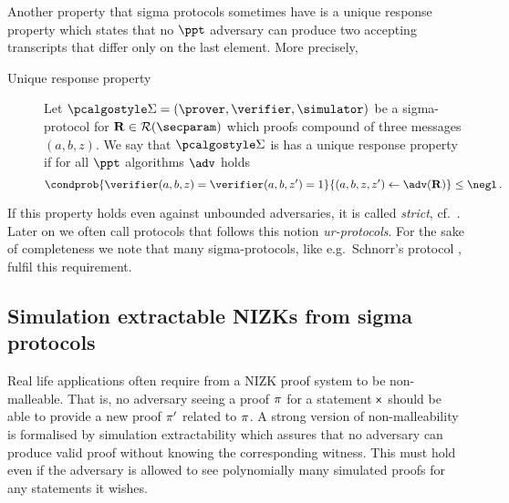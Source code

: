 \let\accentvec\vec \documentclass[runningheads]{llncs}
\begin{document}
Another property that sigma protocols sometimes have is a unique response property \cite{C:Fischlin05} which states that no
$\ppt$ adversary  can produce two accepting transcripts that differ only on
the last element.  More precisely,
\begin{description}
	\item[Unique response property] Let $\sigmaprot = (\prover, \verifier,
			\simulator)$ be a sigma-protocol for $\REL \in \RELGEN(\secparam)$ which
			proofs compound of three messages $(a, b, z)$. We say that
			$\sigmaprot$ is has a unique response property if for all $\ppt$
			algorithms $\adv$ holds 
			\[
				\condprob{\verifier (a, b, z) = \verifier (a, b, z')  = 1}{(a, b, z,
				z') \gets \adv(\REL)} \leq \negl\,.
			\]
\end{description}
If this property holds even against unbounded adversaries, it is called \emph{strict}, cf.~\cite{INDOCRYPT:FKMV12}.
Later on we often call protocols that follows this notion \emph{ur-protocols}.
For the sake of completeness we note that many sigma-protocols, like e.g.~Schnorr's protocol \cite{C:Schnorr89}, fulfil this requirement.


\subsection{Simulation extractable NIZKs from sigma protocols}
Real life applications often require from a NIZK proof system to be
non-malleable. That is, no adversary seeing a proof $\pi$ for a statement
$\mathsf{x}$ should be able to provide a new proof $\pi'$ related to
$\pi$.  A strong version of non-malleability is formalised by simulation
extractability which assures that no adversary can produce valid proof
without knowing the corresponding witness. This must hold even if the
adversary is allowed to see polynomially many simulated proofs for any
statements it wishes.
\end{document}
